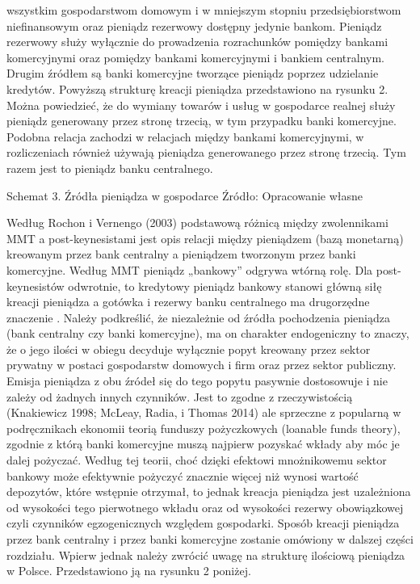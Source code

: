 \documentclass[
]{book}
\begin{document}
wszystkim gospodarstwom domowym i w mniejszym stopniu przedsiębiorstwom niefinansowym oraz pieniądz rezerwowy dostępny jedynie bankom. Pieniądz rezerwowy służy wyłącznie do prowadzenia rozrachunków pomiędzy bankami komercyjnymi oraz pomiędzy bankami komercyjnymi i bankiem centralnym. Drugim źródłem są banki komercyjne tworzące pieniądz poprzez udzielanie kredytów. Powyższą strukturę kreacji pieniądza przedstawiono na rysunku 2. Można powiedzieć, że do wymiany towarów i usług w gospodarce realnej służy pieniądz generowany przez stronę trzecią, w tym przypadku banki komercyjne. Podobna relacja zachodzi w relacjach między bankami komercyjnymi, w rozliczeniach również używają pieniądza generowanego przez stronę trzecią. Tym razem jest to pieniądz banku centralnego.

Schemat 3. Źródła pieniądza w gospodarce Źródło: Opracowanie własne

Według Rochon i Vernengo (2003) podstawową różnicą między zwolennikami MMT a post-keynesistami jest opis relacji między pieniądzem (bazą monetarną) kreowanym przez bank centralny a pieniądzem tworzonym przez banki komercyjne. Według MMT pieniądz „bankowy'' odgrywa wtórną rolę. Dla post-keynesistów odwrotnie, to kredytowy pieniądz bankowy stanowi główną siłę kreacji pieniądza a gotówka i rezerwy banku centralnego ma drugorzędne znaczenie . Należy podkreślić, że niezależnie od źródła pochodzenia pieniądza (bank centralny czy banki komercyjne), ma on charakter endogeniczny to znaczy, że o jego ilości w obiegu decyduje wyłącznie popyt kreowany przez sektor prywatny w postaci gospodarstw domowych i firm oraz przez sektor publiczny. Emisja pieniądza z obu źródeł się do tego popytu pasywnie dostosowuje i nie zależy od żadnych innych czynników. Jest to zgodne z rzeczywistością (Knakiewicz 1998; McLeay, Radia, i Thomas 2014) ale sprzeczne z popularną w podręcznikach ekonomii teorią funduszy pożyczkowych (loanable funds theory), zgodnie z którą banki komercyjne muszą najpierw pozyskać wkłady aby móc je dalej pożyczać. Według tej teorii, choć dzięki efektowi mnożnikowemu sektor bankowy może efektywnie pożyczyć znacznie więcej niż wynosi wartość depozytów, które wstępnie otrzymał, to jednak kreacja pieniądza jest uzależniona od wysokości tego pierwotnego wkładu oraz od wysokości rezerwy obowiązkowej czyli czynników egzogenicznych względem gospodarki. Sposób kreacji pieniądza przez bank centralny i przez banki komercyjne zostanie omówiony w dalszej części rozdziału. Wpierw jednak należy zwrócić uwagę na strukturę ilościową pieniądza w Polsce. Przedstawiono ją na rysunku 2 poniżej.
\end{document}
